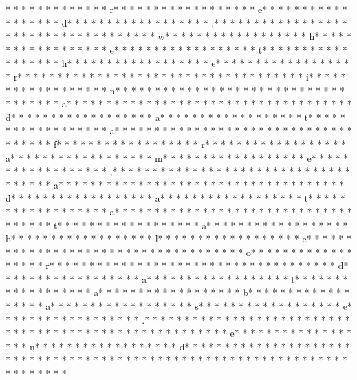 *  * * *  *  * * *  *  * * *  * r* * *  * * *  * * *  *  * * *  *  * * *  * e* * *  * * *  * * *  *  * * *  *  * * *  * d* * *  * * *  * * *  *  * * *  *  * * *  * ,* * *  * * *  * * *  *  * * *  *  * * *  *  * * *  * * *  * * *  *  * * *  *  * * *  * w* * *  * * *  * * *  *  * * *  *  * * *  * h* * *  * * *  * * *  *  * * *  *  * * *  * e* * *  * * *  * * *  *  * * *  *  * * *  * t* * *  * * *  * * *  *  * * *  *  * * *  * h* * *  * * *  * * *  *  * * *  *  * * *  * e* * *  * * *  * * *  *  * * *  *  * * *  * r* * *  * * *  * * *  *  * * *  *  * * *  *  * * *  * * *  * * *  *  * * *  *  * * *  * i* * *  * * *  * * *  *  * * *  *  * * *  * n* * *  * * *  * * *  *  * * *  *  * * *  *  * * *  * * *  * * *  *  * * *  *  * * *  * a* * *  * * *  * * *  *  * * *  *  * * *  *  * * *  * * *  * * *  *  * * *  *  * * *  * d* * *  * * *  * * *  *  * * *  *  * * *  * a* * *  * * *  * * *  *  * * *  *  * * *  * t* * *  * * *  * * *  *  * * *  *  * * *  * a* * *  * * *  * * *  *  * * *  *  * * *  *  * * *  * * *  * * *  *  * * *  *  * * *  * f* * *  * * *  * * *  *  * * *  *  * * *  * r* * *  * * *  * * *  *  * * *  *  * * *  * a* * *  * * *  * * *  *  * * *  *  * * *  * m* * *  * * *  * * *  *  * * *  *  * * *  * e* * *  * * *  * * *  *  * * *  *  * * *  * ,* * *  * * *  * * *  *  * * *  *  * * *  *  * * *  * * *  * * *  *  * * *  *  * * *  * a* * *  * * *  * * *  *  * * *  *  * * *  *  * * *  * * *  * * *  *  * * *  *  * * *  * d* * *  * * *  * * *  *  * * *  *  * * *  * a* * *  * * *  * * *  *  * * *  *  * * *  * t* * *  * * *  * * *  *  * * *  *  * * *  * a* * *  * * *  * * *  *  * * *  *  * * *  *  * * *  * * *  * * *  *  * * *  *  * * *  * t* * *  * * *  * * *  *  * * *  *  * * *  * a* * *  * * *  * * *  *  * * *  *  * * *  * b* * *  * * *  * * *  *  * * *  *  * * *  * l* * *  * * *  * * *  *  * * *  *  * * *  * e* * *  * * *  * * *  *  * * *  *  * * *  *  * * *  * * *  * * *  *  * * *  *  * * *  * o* * *  * * *  * * *  *  * * *  *  * * *  * r* * *  * * *  * * *  *  * * *  *  * * *  *  * * *  * * *  * * *  *  * * *  *  * * *  * d* * *  * * *  * * *  *  * * *  *  * * *  * a* * *  * * *  * * *  *  * * *  *  * * *  * t* * *  * * *  * * *  *  * * *  *  * * *  * a* * *  * * *  * * *  *  * * *  *  * * *  * b* * *  * * *  * * *  *  * * *  *  * * *  * a* * *  * * *  * * *  *  * * *  *  * * *  * s* * *  * * *  * * *  *  * * *  *  * * *  * e* * *  * * *  * * *  *  * * *  *  * * *  * .* * *  * * *  * * *  *  * * *  *  * * *  * 
* * *  * * *  * * *  *  * * *  *  * * *  * 	* * *  * * *  * * *  *  * * *  *  * * *  * e* * *  * * *  * * *  *  * * *  *  * * *  * n* * *  * * *  * * *  *  * * *  *  * * *  * d* * *  * * *  * * *  *  * * *  *  * * *  * {* * *  * * *  * * *  *  * * *  *  * * *  *  * * *  * * *  * * *  *  * * *  *  * * *  * }* * *  * * *  * * *  *  * * *  *  * * *  * 
